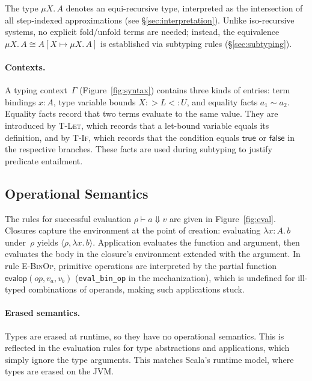 \documentclass[acmsmall]{acmart}
\begin{document}
The type $\mu X.\, A$ denotes an equi-recursive type, interpreted as the intersection of all step-indexed approximations (see \S\ref{sec:interpretation}). Unlike iso-recursive systems, no explicit fold/unfold terms are needed; instead, the equivalence $\mu X.\, A \cong A[X \mapsto \mu X.\, A]$ is established via subtyping rules (\S\ref{sec:subtyping}).



\paragraph{Contexts.}
A typing context~$\Gamma$ (Figure~\ref{fig:syntax}) contains three kinds of entries: term bindings $x : A$, type variable bounds $X :> L <: U$, and equality facts $a_1 \sim a_2$. Equality facts record that two terms evaluate to the same value. They are introduced by \textsc{T-Let}, which records that a let-bound variable equals its definition, and by \textsc{T-If}, which records that the condition equals $\textsf{true}$ or $\textsf{false}$ in the respective branches. These facts are used during subtyping to justify predicate entailment.

\subsection{Operational Semantics}\label{sec:operational-semantics}

The rules for successful evaluation $\rho \vdash a \Downarrow v$ are given in Figure~\ref{fig:eval}. Closures capture the environment at the point of creation: evaluating $\lambda x{:}A.\, b$ under~$\rho$ yields $\langle \rho, \lambda x.\, b \rangle$. Application evaluates the function and argument, then evaluates the body in the closure's environment extended with the argument. In rule \textsc{E-BinOp}, primitive operations are interpreted by the partial function $\textsf{evalop}(\mathit{op}, v_a, v_b)$ (\texttt{eval\_bin\_op} in the mechanization), which is undefined for ill-typed combinations of operands, making such applications stuck.

\paragraph{Erased semantics.}
Types are erased at runtime, so they have no operational semantics. This is reflected in the evaluation rules for type abstractions and applications, which simply ignore the type arguments. This matches Scala's runtime model, where types are erased on the JVM.
\end{document}

